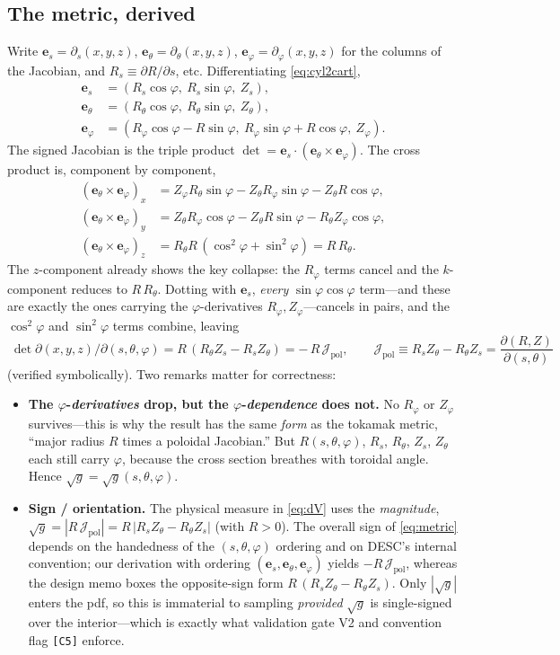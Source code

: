 \documentclass[11pt]{article}
\newcommand{\sg}{\sqrt{g}}
\newcommand{\Jpol}{\mathcal{J}_{\mathrm{pol}}}
\newcommand{\Rs}{R_{s}}
\newcommand{\Rt}{R_{\theta}}
\newcommand{\Rp}{R_{\varphi}}
\newcommand{\Zs}{Z_{s}}
\newcommand{\Zt}{Z_{\theta}}
\newcommand{\Zp}{Z_{\varphi}}
\newcommand{\es}{\mathbf{e}_{s}}
\newcommand{\et}{\mathbf{e}_{\theta}}
\newcommand{\ep}{\mathbf{e}_{\varphi}}
\newcommand{\code}[1]{\texttt{#1}}
\begin{document}
\subsection{The metric, derived}
\label{sec:metric}

Write $\es=\partial_s(x,y,z)$, $\et=\partial_\theta(x,y,z)$,
$\ep=\partial_\varphi(x,y,z)$ for the columns of the Jacobian, and $R_s\equiv
\partial R/\partial s$, etc. Differentiating \eqref{eq:cyl2cart},
\begin{align}
\es&=(\Rs\cos\varphi,\ \Rs\sin\varphi,\ \Zs),\\
\et&=(\Rt\cos\varphi,\ \Rt\sin\varphi,\ \Zt),\\
\ep&=(\Rp\cos\varphi-R\sin\varphi,\ \Rp\sin\varphi+R\cos\varphi,\ \Zp).
\end{align}
The signed Jacobian is the triple product $\det=\es\cdot(\et\times\ep)$. The cross
product is, component by component,
\begin{align}
(\et\times\ep)_x&=\Zp\Rt\sin\varphi-\Zt\Rp\sin\varphi-\Zt R\cos\varphi,\\
(\et\times\ep)_y&=\Zt\Rp\cos\varphi-\Zt R\sin\varphi-\Rt\Zp\cos\varphi,\\
(\et\times\ep)_z&=\Rt R\,(\cos^2\varphi+\sin^2\varphi)=R\,\Rt .
\end{align}
The $z$-component already shows the key collapse: the $\Rp$ terms cancel and the
$k$-component reduces to $R\,\Rt$. Dotting with $\es$, \emph{every}
$\sin\varphi\cos\varphi$ term---and these are exactly the ones carrying the
$\varphi$-derivatives $\Rp,\Zp$---cancels in pairs, and the $\cos^2\varphi$ and
$\sin^2\varphi$ terms combine, leaving
\begin{equation}
\boxed{\;
\det\partial(x,y,z)/\partial(s,\theta,\varphi)
=R\,(\Rt\Zs-\Rs\Zt)
=-\,R\,\Jpol,\qquad
\Jpol\equiv \Rs\Zt-\Rt\Zs=\frac{\partial(R,Z)}{\partial(s,\theta)}\; }
\label{eq:metric}
\end{equation}
(verified symbolically). Two remarks matter for correctness:

\begin{itemize}
\item \textbf{The $\varphi$-\emph{derivatives} drop, but the
$\varphi$-\emph{dependence} does not.} No $\Rp$ or $\Zp$ survives---this is why the
result has the same \emph{form} as the tokamak metric, ``major radius $R$ times a
poloidal Jacobian.'' But $R(s,\theta,\varphi)$, $\Rs$, $\Rt$, $\Zs$, $\Zt$ each
still carry $\varphi$, because the cross section breathes with toroidal angle.
Hence $\sg=\sg(s,\theta,\varphi)$.
\item \textbf{Sign / orientation.} The physical measure in \eqref{eq:dV} uses the
\emph{magnitude}, $\sg=|R\,\Jpol|=R\,|\Rs\Zt-\Rt\Zs|$ (with $R>0$). The overall
sign of \eqref{eq:metric} depends on the handedness of the $(s,\theta,\varphi)$
ordering and on DESC's internal convention; our derivation with ordering
$(\es,\et,\ep)$ yields $-R\,\Jpol$, whereas the design memo boxes the opposite-sign
form $R\,(\Rs\Zt-\Rt\Zs)$. Only $|\sg|$ enters the pdf, so this is immaterial to
sampling \emph{provided} $\sg$ is single-signed over the interior---which is exactly
what validation gate V2 and convention flag \code{[C5]} enforce.
\end{itemize}
\end{document}
